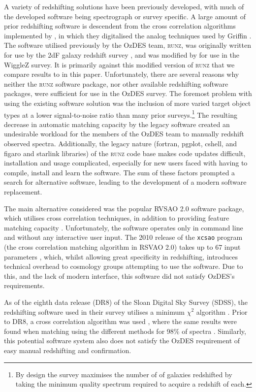 \documentclass[5p]{elsarticle}
\newcommand{\runz}{\textsc{runz}}
\begin{document}
A variety of redshifting solutions have been previously developed, with much of the developed software being spectrograph or survey specific. A large amount of prior redshifting software is descendent from the cross correlation algorithms implemented by \citet{tonry1979survey}, in which they digitalised the analog techniques used by Griffin \cite{griffin1967photoelectric}. The software utilised previously by the OzDES team,  \runz{}, was originally written for use by the 2dF galaxy redshift survey \citep{colless2001}, and was modified by \citet{saunders2004} for use in the WiggleZ survey. It is primarily against this modified version of \runz{} that we compare results to in this paper.  Unfortunately, there are several reasons why neither the \runz{} software package, nor other available redshifting software packages, were sufficient for use in the OzDES survey. The foremost problem with using the existing software solution was the inclusion of more varied target object types at a lower signal-to-noise ratio than many prior surveys.\footnote{By design the survey maximises the number of of galaxies redshifted by taking the minimum quality spectrum required to acquire a redshift of each.}  The resulting decrease in automatic matching capacity by the legacy software created an undesirable workload for the members of the OzDES team to manually redshift observed spectra. Additionally, the legacy nature (fortran, pgplot, cshell, and figaro and starlink libraries) of the \runz{} code base makes code updates difficult, installation and usage complicated, especially for new users faced with having to compile, install and learn the software. The sum of these factors prompted a search for alternative software, leading to the development of a modern software replacement.

The main alternative considered was the popular RVSAO 2.0 software package, which utilises cross correlation techniques, in addition to providing feature matching capacity \citep{kurtz1998rvsao}. Unfortunately, the software operates only in command line and without any interactive user input. The 2010 release of the \verb+xcsao+ program (the cross correlation matching algorithm in RSVAO 2.0) takes up to 67 input parameters \citep{parameters2}, which, whilst allowing great specificity in redshifting, introduces technical overhead to cosmology groups attempting to use the software. Due to this, and the lack of modern interface, this software did not satisfy OzDES's requirements.

As of the eighth data release (DR8) of the Sloan Digital Sky Survey (SDSS), the redshifting software used in their survey utilises a minimum $\chi^2$ algorithm \citep{aihara2011eighth}. Prior to DR8, a cross correlation algorithm was used  \citep{sdss6}, where the same results were found when matching using the different methods for 98\% of spectra \cite{aihara2011eighth}. Similarly, this potential software system also does not satisfy the OzDES requirement of easy manual redshifting and confirmation. %
\end{document}
